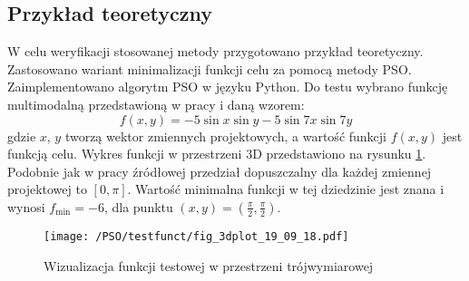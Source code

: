 \subsection{Przykład teoretyczny} \label{sect: pso_single_teor_exampl}
W celu weryfikacji stosowanej metody przygotowano przykład teoretyczny. Zastosowano wariant minimalizacji funkcji celu za pomocą metody PSO. Zaimplementowano algorytm PSO w języku Python. Do testu wybrano funkcję multimodalną przedstawioną w pracy \parencite{Tesch2016} i daną wzorem:
\begin{equation} \label{eq: pso_test_func}
	f(x,y) = -5\sin{x}\sin{y}-5\sin{7x}\sin{7y}
\end{equation}
gdzie $x$, $y$ tworzą wektor zmiennych projektowych, a wartość funkcji $f(x,y)$ jest funkcją celu. Wykres funkcji w przestrzeni 3D przedstawiono na rysunku \ref{fig: pso_example_function}. Podobnie jak w pracy źródłowej przedział dopuszczalny dla każdej zmiennej projektowej to $[0,\pi]$. Wartość minimalna funkcji w tej dziedzinie jest znana i wynosi $f_{\text{min}}=-6$, dla punktu $(x,y)=(\frac{\pi}{2},\frac{\pi}{2})$.
\begin{figure}[h]
	\centering
	\texttt{[image: /PSO/testfunct/fig\_3dplot\_19\_09\_18.pdf]} 
	\captionsetup{justification=centering}
	\caption{Wizualizacja funkcji testowej w przestrzeni trójwymiarowej}
	\label{fig: pso_example_function}
\end{figure}

